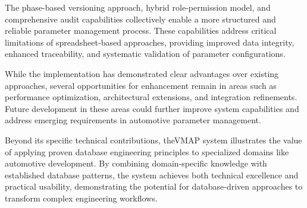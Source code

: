 The phase-based versioning approach, hybrid role-permission model, and comprehensive audit capabilities collectively enable a more structured and reliable parameter management process. These capabilities address critical limitations of spreadsheet-based approaches, providing improved data integrity, enhanced traceability, and systematic validation of parameter configurations.

While the implementation has demonstrated clear advantages over existing approaches, several opportunities for enhancement remain in areas such as performance optimization, architectural extensions, and integration refinements. Future development in these areas could further improve system capabilities and address emerging requirements in automotive parameter management.

Beyond its specific technical contributions, the\ac{VMAP} system illustrates the value of applying proven database engineering principles to specialized domains like automotive development. By combining domain-specific knowledge with established database patterns, the system achieves both technical excellence and practical usability, demonstrating the potential for database-driven approaches to transform complex engineering workflows.